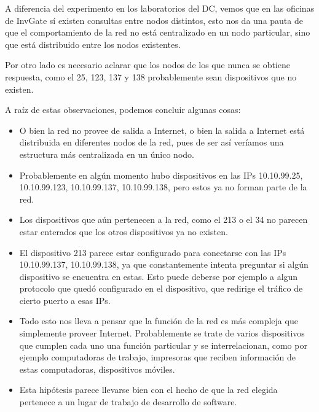 A diferencia del experimento en los laboratorios del DC, vemos que en las oficinas de InvGate sí existen consultas entre nodos distintos, esto nos da una pauta de que el comportamiento de la red no está centralizado en un nodo particular, sino que está distribuido entre los nodos existentes.

Por otro lado es necesario aclarar que los nodos de los que nunca se obtiene respuesta, como el 25, 123, 137 y 138 probablemente sean dispositivos que no existen.

A raíz de estas observaciones, podemos concluir algunas cosas:
\begin{itemize}
  \item O bien la red no provee de salida a Internet, o bien la salida a Internet está distribuida en diferentes nodos de la red, pues de ser así veríamos una estructura más centralizada en un único nodo.
  \item Probablemente en algún momento hubo dispositivos en las IPs 10.10.99.25, 10.10.99.123, 10.10.99.137, 10.10.99.138, pero estos ya no forman parte de la red.
  \item Los dispositivos que aún pertenecen a la red, como el 213 o el 34 no parecen estar enterados que los otros dispositivos ya no existen.
  \item El dispositivo 213 parece estar configurado para conectarse con las IPs 10.10.99.137, 10.10.99.138, ya que constantemente intenta preguntar si algún dispositivo se encuentra en estas. Esto puede deberse por ejemplo a algun protocolo que quedó configurado en el dispositivo, que redirige el tráfico de cierto puerto a esas IPs.
  \item Todo esto nos lleva a pensar que la función de la red es más compleja que simplemente proveer Internet. Probablemente se trate de varios dispositivos que cumplen cada uno una función particular y se interrelacionan, como por ejemplo computadoras de trabajo, impresoras que reciben información de estas computadoras, dispositivos móviles.
  \item Esta hipótesis parece llevarse bien con el hecho de que la red elegida pertenece a un lugar de trabajo de desarrollo de software.
\end{itemize}

